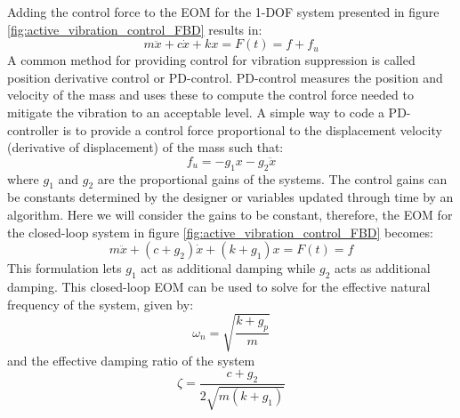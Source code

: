 \documentclass[12pt,letter]{article}
\numberwithin{ex}{section} %
\numberwithin{re}{section} %
\begin{document}
Adding the control force to the EOM for the 1-DOF system presented in figure \ref{fig:active_vibration_control_FBD} results in:
\begin{equation}
m \ddot{x} + c \dot{x} + kx = F(t) = f + f_u
\end{equation}
A common method for providing control for vibration suppression is called position derivative control or PD-control. PD-control measures the position and velocity of the mass and uses these to compute the control force needed to mitigate the vibration to an acceptable level. A simple way to code a PD-controller is to provide a control force proportional to the displacement velocity (derivative of displacement) of the mass such that:
\begin{equation}
f_u = -g_1x - g_2 \ddot{x}
\end{equation}
where $g_1$ and $g_2$ are the proportional gains of the systems. The control gains can be constants determined by the designer or variables updated through time by an algorithm. Here we will consider the gains to be constant, therefore, the EOM for the closed-loop system in figure \ref{fig:active_vibration_control_FBD} becomes:
\begin{equation}
m \ddot{x} + (c + g_2) \dot{x} + (k + g_1)x = F(t) = f 
\end{equation}
This formulation lets $g_1$ act as additional damping while $g_2$ acts as additional damping. This closed-loop EOM can be used to solve for the effective natural frequency of the system, given by:
\begin{equation}
\omega_n = \sqrt{\frac{k+g_p}{m}}
\end{equation}
and the effective damping ratio of the system
\begin{equation}
\zeta = \frac{c+g_2}{2\sqrt{m(k+g_1)}}
\end{equation}



























			\noindent
			

	\pagebreak
	\renewcommand{\thepage}{}
	\renewcommand\refname{References Cited}
	\pagestyle{plain}
	
	
	
\end{document}
